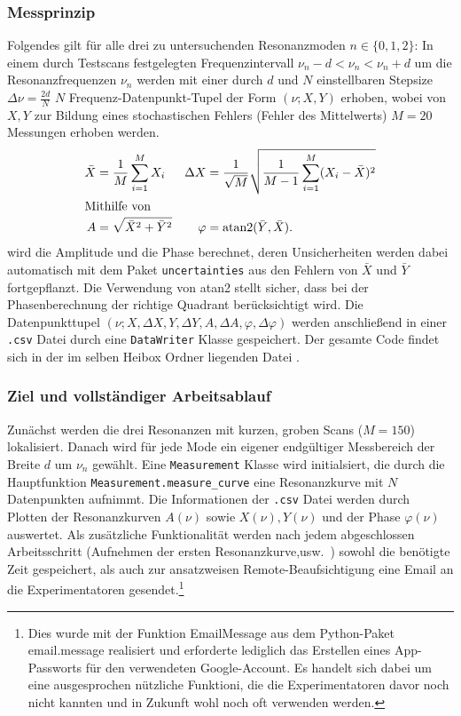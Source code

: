 \documentclass[11pt,a4paper]{article}
\begin{document}
\subsubsection{Messprinzip}
Folgendes gilt für alle drei zu untersuchenden Resonanzmoden \(n\in\{0,1,2\}\): In einem durch Testscans festgelegten Frequenzintervall \(\nu_n-d<\nu_n<\nu_n+d\) um die Resonanzfrequenzen \(\nu_n\) werden mit einer durch \(d\) und \(N\) einstellbaren Stepsize \(\Delta \nu=\frac{2d}{N}\) \(N\) Frequenz-Datenpunkt-Tupel der Form \((\nu;X,Y)\) erhoben, wobei von \(X,Y\) zur Bildung eines stochastischen Fehlers (Fehler des Mittelwerts) \(M=20\) Messungen erhoben werden. 
\begin{align}
    \bar{X}&=\frac{1}{M}\sum_{i=1}^{M}X_i &
    \Delta X&=\frac{1}{\sqrt{M}}\sqrt{\frac{1}{M-1}\sum_{i=1}^{M}(X_i-\bar{X})^2}\\
    \intertext{Mithilfe von}
    A&=\sqrt{\bar X^2+\bar Y^2} & \varphi&=\operatorname{atan2}(\bar Y,\bar X).
\end{align}
wird die Amplitude und die Phase berechnet, deren Unsicherheiten werden dabei automatisch mit dem  Paket \texttt{uncertainties} aus den Fehlern von $\bar X$ und $\bar Y$ fortgepflanzt. Die Verwendung von atan2 stellt sicher, dass bei der Phasenberechnung der richtige Quadrant
berücksichtigt wird. Die Datenpunkttupel \((\nu;X,\Delta X,Y,\Delta Y,A,\Delta A,\varphi,\Delta \varphi)\) werden anschließend in einer \verb|.csv| Datei durch eine \verb|DataWriter| Klasse gespeichert. Der gesamte Code findet sich in der im selben Heibox Ordner liegenden Datei \textcolor{blue}{\texttt{}}.

\subsubsection{Ziel und vollständiger Arbeitsablauf}
Zunächst werden die drei Resonanzen mit kurzen, groben Scans (\(M=150\)) lokalisiert. Danach wird für jede Mode ein eigener endgültiger Messbereich der Breite \(d\) um \(\nu_n\) gewählt. Eine \verb|Measurement| Klasse wird initialsiert, die durch die Hauptfunktion \verb|Measurement.measure_curve| eine Resonanzkurve mit \(N\) Datenpunkten aufnimmt. Die Informationen der \verb|.csv| Datei werden durch Plotten der Resonanzkurven \(A(\nu)\) sowie \(X(\nu),Y(\nu)\) und der Phase \(\varphi(\nu)\) auswertet. Als zusätzliche Funktionalität werden nach jedem abgeschlossen Arbeitsschritt (Aufnehmen der ersten Resonanzkurve,usw.\ ) sowohl die benötigte Zeit gespeichert, als auch zur ansatzweisen Remote-Beaufsichtigung eine Email an die Experimentatoren gesendet.\footnote{Dies wurde mit der Funktion EmailMessage aus dem Python-Paket email.message realisiert und erforderte lediglich das Erstellen eines App-Passworts für den verwendeten Google-Account. Es handelt sich dabei um eine ausgesprochen nützliche Funktioni, die die Experimentatoren davor noch nicht kannten und in Zukunft wohl noch oft verwenden werden.}
\end{document}

